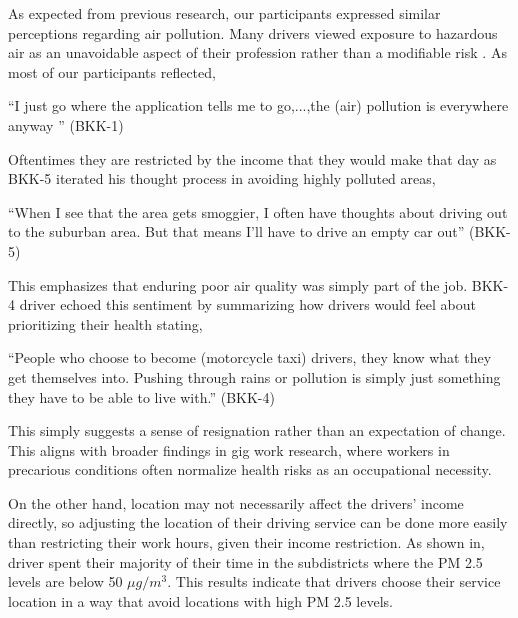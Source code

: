 As expected from previous research, our participants expressed similar perceptions regarding air pollution. Many drivers viewed exposure to hazardous air as an unavoidable aspect of their profession rather than a modifiable risk \cite{tieanklin2024rideshare}. 
As most of our participants reflected,

\begin{quoteb}
    ``I just go where the application tells me to go,...,the (air) pollution is everywhere anyway '' (BKK-1)
\end{quoteb}

Oftentimes they are restricted by the income that they would make that day as BKK-5 iterated his thought process in avoiding highly polluted areas,

\begin{quoteb}
    ``When I see that the area gets smoggier, I often have thoughts about driving out to the suburban area. But that means I'll have to drive an empty car out'' (BKK-5)
\end{quoteb}


This emphasizes that enduring poor air quality was simply part of the job. BKK-4 driver echoed this sentiment by summarizing how drivers would feel about prioritizing their health stating, 

\begin{quoteb}
    ``People who choose to become (motorcycle taxi) drivers, they know what they get themselves into. Pushing through rains or pollution is simply just something they have to be able to live with.'' (BKK-4)
\end{quoteb}

This simply suggests a sense of resignation rather than an expectation of change. 
This aligns with broader findings in gig work research, where workers in precarious conditions often normalize health risks as an occupational necessity.

On the other hand, location may not necessarily affect the drivers' income directly, so adjusting the location of their driving service can be done more easily than restricting their work hours, given their income restriction.
As shown in, 
driver spent their majority of their time in the subdistricts where the PM 2.5 levels are below 50 $\mu g / m^3$.
This results indicate that drivers choose their service location in a way that avoid locations with high PM 2.5 levels.


